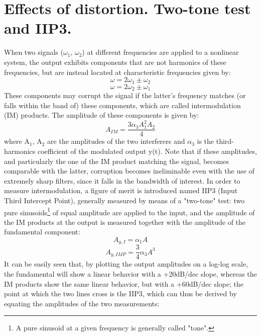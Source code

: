 
\section{Effects of distortion. Two-tone test and IIP3.}

When two signals ($\omega_1$, $\omega_2$) at different frequencies are applied to a nonlinear system, the output exhibits components that are not harmonics of these frequencies, but are instead located at characteristic frequencies given by: 
\begin{equation}
	\omega = 2\omega_1 \pm \omega_2
\end{equation}
\begin{equation}
	\omega = 2\omega_2 \pm \omega_1
\end{equation}
These components may corrupt the signal if the latter's frequency matches (or falls within the band of) these components, which are called intermodulation (IM) products. The amplitude of these components is given by: 
\begin{equation}
A_{IM} = \frac{3\alpha_3A_1^2A_2}{4}
\end{equation}
where A$_1$, A$_2$ are the amplitudes of the two interferers and $\alpha_3$ is the third-harmonics coefficient of the modulated output y(t). 
Note that if these amplitudes, and particularly the one of the IM product matching the signal, becomes comparable with the latter, corruption becomes ineliminable even with the use of extremely sharp filters, since it falls in the bandwidth of interest. 
In order to measure intermodulation, a figure of merit is introduced named IIP3 (Input Third Intercept Point), generally measured by means of a "two-tone" test: two pure sinusoids\footnote{A pure sinusoid at a given frequency is generally called "tone".} of equal amplitude are applied to the input, and the amplitude of the IM products at the output is measured together with the amplitude of the fundamental component: 
\begin{equation}
	A_{y,I} = \alpha_1A
\end{equation}
\begin{equation}
	A_{y,IMP} = \frac{3}{4}\alpha_3 A^3
\end{equation}
It can be easily seen that, by plotting the output amplitudes on a log-log scale, the fundamental will show a linear behavior with a +20dB/dec slope, whereas the IM products show the same linear behavior, but with a +60dB/dec slope; the point at which the two lines cross is the IIP3, which can thus be derived by equating the amplitudes of the two measurements: 
